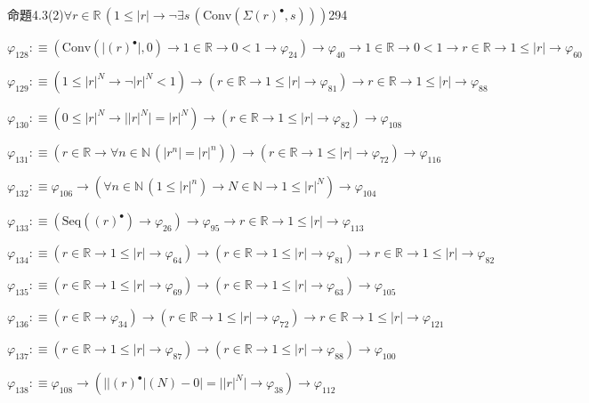 \begin{fullproof}{命題4.3(2)}{$\forall r \in \mathbb{R}\,(1 \leq \lvert r \rvert \to \neg \exists s\,(\mathrm{Conv}(\Sigma {(r)^{\bullet}},s)))$}{294}
\begin{abbrevlist}
\item $\varphi_{128} :\equiv (\mathrm{Conv}(\lvert {(r)^{\bullet}} \rvert,0) \to 1 \in \mathbb{R} \to 0 < 1 \to \varphi_{24}) \to \varphi_{40} \to 1 \in \mathbb{R} \to 0 < 1 \to r \in \mathbb{R} \to 1 \leq \lvert r \rvert \to \varphi_{60}$
\item $\varphi_{129} :\equiv (1 \leq {{\lvert r \rvert}^{N}} \to \neg {{\lvert r \rvert}^{N}} < 1) \to (r \in \mathbb{R} \to 1 \leq \lvert r \rvert \to \varphi_{81}) \to r \in \mathbb{R} \to 1 \leq \lvert r \rvert \to \varphi_{88}$
\item $\varphi_{130} :\equiv (0 \leq {{\lvert r \rvert}^{N}} \to \lvert {{\lvert r \rvert}^{N}} \rvert = {{\lvert r \rvert}^{N}}) \to (r \in \mathbb{R} \to 1 \leq \lvert r \rvert \to \varphi_{82}) \to \varphi_{108}$
\item $\varphi_{131} :\equiv (r \in \mathbb{R} \to \forall n \in \mathbb{N}\,(\lvert {{r}^{n}} \rvert = {{\lvert r \rvert}^{n}})) \to (r \in \mathbb{R} \to 1 \leq \lvert r \rvert \to \varphi_{72}) \to \varphi_{116}$
\item $\varphi_{132} :\equiv \varphi_{106} \to (\forall n \in \mathbb{N}\,(1 \leq {{\lvert r \rvert}^{n}}) \to N \in \mathbb{N} \to 1 \leq {{\lvert r \rvert}^{N}}) \to \varphi_{104}$
\item $\varphi_{133} :\equiv (\mathrm{Seq}({(r)^{\bullet}}) \to \varphi_{26}) \to \varphi_{95} \to r \in \mathbb{R} \to 1 \leq \lvert r \rvert \to \varphi_{113}$
\item $\varphi_{134} :\equiv (r \in \mathbb{R} \to 1 \leq \lvert r \rvert \to \varphi_{64}) \to (r \in \mathbb{R} \to 1 \leq \lvert r \rvert \to \varphi_{81}) \to r \in \mathbb{R} \to 1 \leq \lvert r \rvert \to \varphi_{82}$
\item $\varphi_{135} :\equiv (r \in \mathbb{R} \to 1 \leq \lvert r \rvert \to \varphi_{69}) \to (r \in \mathbb{R} \to 1 \leq \lvert r \rvert \to \varphi_{63}) \to \varphi_{105}$
\item $\varphi_{136} :\equiv (r \in \mathbb{R} \to \varphi_{34}) \to (r \in \mathbb{R} \to 1 \leq \lvert r \rvert \to \varphi_{72}) \to r \in \mathbb{R} \to 1 \leq \lvert r \rvert \to \varphi_{121}$
\item $\varphi_{137} :\equiv (r \in \mathbb{R} \to 1 \leq \lvert r \rvert \to \varphi_{87}) \to (r \in \mathbb{R} \to 1 \leq \lvert r \rvert \to \varphi_{88}) \to \varphi_{100}$
\item $\varphi_{138} :\equiv \varphi_{108} \to (\lvert \lvert {(r)^{\bullet}} \rvert(N) - 0 \rvert = \lvert {{\lvert r \rvert}^{N}} \rvert \to \varphi_{38}) \to \varphi_{112}$

\end{abbrevlist}
\end{fullproof}
